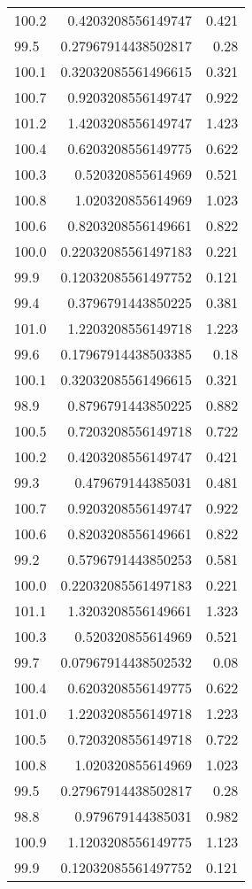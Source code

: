 \begin{table}[h!]
\begin{tabular}{l | r | r}
100.2 & 0.4203208556149747 & 0.421 \\
99.5 & 0.27967914438502817 & 0.28 \\
100.1 & 0.32032085561496615 & 0.321 \\
100.7 & 0.9203208556149747 & 0.922 \\
101.2 & 1.4203208556149747 & 1.423 \\
100.4 & 0.6203208556149775 & 0.622 \\
100.3 & 0.520320855614969 & 0.521 \\
100.8 & 1.020320855614969 & 1.023 \\
100.6 & 0.8203208556149661 & 0.822 \\
100.0 & 0.22032085561497183 & 0.221 \\
99.9 & 0.12032085561497752 & 0.121 \\
99.4 & 0.3796791443850225 & 0.381 \\
101.0 & 1.2203208556149718 & 1.223 \\
99.6 & 0.17967914438503385 & 0.18 \\
100.1 & 0.32032085561496615 & 0.321 \\
98.9 & 0.8796791443850225 & 0.882 \\
100.5 & 0.7203208556149718 & 0.722 \\
100.2 & 0.4203208556149747 & 0.421 \\
99.3 & 0.479679144385031 & 0.481 \\
100.7 & 0.9203208556149747 & 0.922 \\
100.6 & 0.8203208556149661 & 0.822 \\
99.2 & 0.5796791443850253 & 0.581 \\
100.0 & 0.22032085561497183 & 0.221 \\
101.1 & 1.3203208556149661 & 1.323 \\
100.3 & 0.520320855614969 & 0.521 \\
99.7 & 0.07967914438502532 & 0.08 \\
100.4 & 0.6203208556149775 & 0.622 \\
101.0 & 1.2203208556149718 & 1.223 \\
100.5 & 0.7203208556149718 & 0.722 \\
100.8 & 1.020320855614969 & 1.023 \\
99.5 & 0.27967914438502817 & 0.28 \\
98.8 & 0.979679144385031 & 0.982 \\
100.9 & 1.1203208556149775 & 1.123 \\
99.9 & 0.12032085561497752 & 0.121 \\

\end{tabular}
\end{table}
